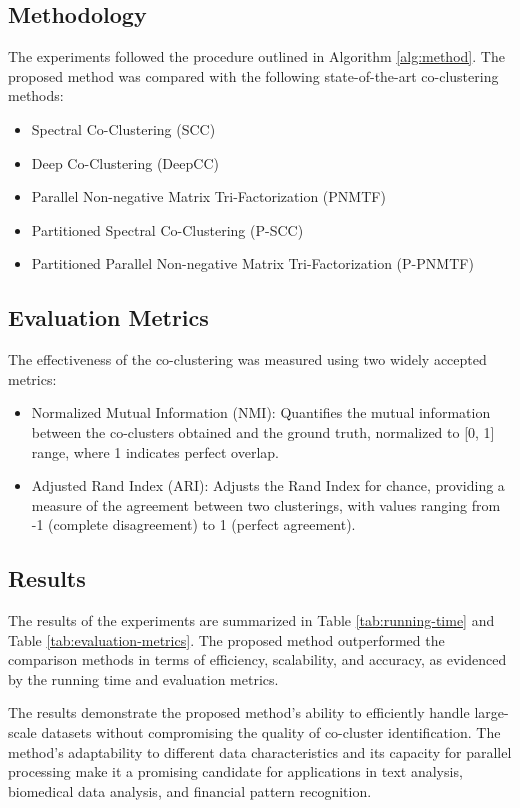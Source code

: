 \subsection{Methodology}
The experiments followed the procedure outlined in Algorithm \ref{alg:method}. The proposed method was compared with the following state-of-the-art co-clustering methods:

\begin{itemize}
    \item Spectral Co-Clustering (SCC)
    \item Deep Co-Clustering (DeepCC)
    \item Parallel Non-negative Matrix Tri-Factorization (PNMTF)
    \item Partitioned Spectral Co-Clustering (P-SCC)
    \item Partitioned Parallel Non-negative Matrix Tri-Factorization (P-PNMTF)
\end{itemize}

\subsection{Evaluation Metrics}
The effectiveness of the co-clustering was measured using two widely accepted metrics:

\begin{itemize}
    \item Normalized Mutual Information (NMI): Quantifies the mutual information between the co-clusters obtained and the ground truth, normalized to [0, 1] range, where 1 indicates perfect overlap.
    \item Adjusted Rand Index (ARI): Adjusts the Rand Index for chance, providing a measure of the agreement between two clusterings, with values ranging from -1 (complete disagreement) to 1 (perfect agreement).
\end{itemize}

\subsection{Results}
The results of the experiments are summarized in Table \ref{tab:running-time} and Table \ref{tab:evaluation-metrics}. The proposed method outperformed the comparison methods in terms of efficiency, scalability, and accuracy, as evidenced by the running time and evaluation metrics.

The results demonstrate the proposed method's ability to efficiently handle large-scale datasets without compromising the quality of co-cluster identification. The method's adaptability to different data characteristics and its capacity for parallel processing make it a promising candidate for applications in text analysis, biomedical data analysis, and financial pattern recognition.

